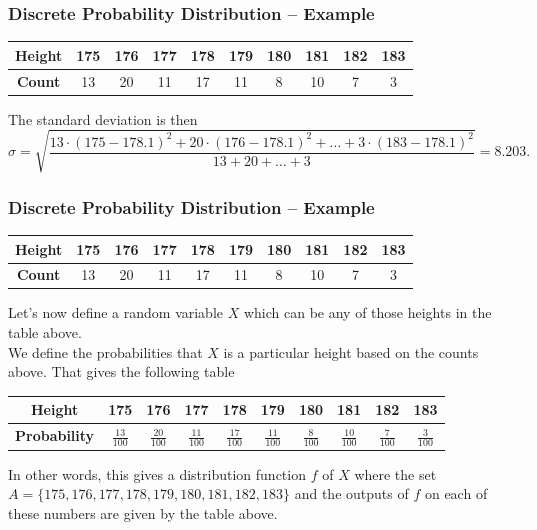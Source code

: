 \documentclass[aspectratio=169,11pt,usenames,dvipsnames,handout]{beamer}
\begin{document}
\begin{frame}
 \frametitle{Discrete Probability Distribution -- Example}
  \begin{center}
  \begin{tabular}{c|ccccccccc}
   \textbf{Height} & 175 & 176 & 177 & 178 & 179 & 180 & 181 & 182 & 183\\
   \midrule
   \textbf{Count} & 13 & 20 & 11 & 17 & 11 & 8 & 10 & 7 & 3
  \end{tabular}
 \end{center}
 The standard deviation is then
 \[
  \sigma = \sqrt{\frac{13 \cdot (175 - 178.1)^2 + 20 \cdot (176 - 178.1)^2 +
  \ldots + 3 \cdot (183 - 178.1)^2}{13 + 20 + \ldots + 3}} = 8.203.
 \]
\end{frame}

\begin{frame}
 \frametitle{Discrete Probability Distribution -- Example}
  \begin{center}
  \begin{tabular}{c|ccccccccc}
   \textbf{Height} & 175 & 176 & 177 & 178 & 179 & 180 & 181 & 182 & 183\\
   \midrule
   \textbf{Count} & 13 & 20 & 11 & 17 & 11 & 8 & 10 & 7 & 3
  \end{tabular}
 \end{center}
 Let's now define a random variable $X$ which can be any of those heights in the
 table above. \\ \pause
 We define the probabilities that $X$ is a particular height based on the counts
 above. That gives the following table
 \begin{center}
  \begin{tabular}{c|ccccccccc}
   \textbf{Height} & 175 & 176 & 177 & 178 & 179 & 180 & 181 & 182 & 183\\
   \midrule
   \textbf{Probability} & $\frac{13}{100}$ & $\frac{20}{100}$ & $\frac{11}{100}$
                        & $\frac{17}{100}$ & $\frac{11}{100}$ & $\frac{8}{100}$
                        & $\frac{10}{100}$ & $\frac{7}{100}$ & $\frac{3}{100}$
  \end{tabular}
 \end{center}
 \pause
 In other words, this gives a \alert{distribution function} $f$ of $X$ where the
 set $A = \{175, 176, 177, 178, 179, 180, 181, 182, 183\}$ and the outputs of
 $f$ on each of these numbers are given by the table above.
\end{frame}
\end{document}
